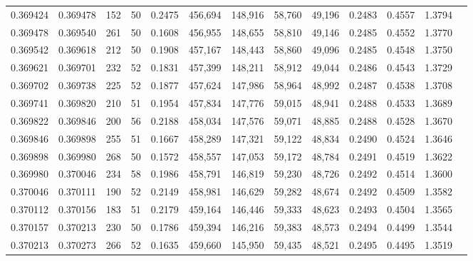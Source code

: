 \begin{tabular}{rrrrrrrrrrrrr}
0.369424 & 0.369478 &   152 &  50 &                                     0.2475 & 456,694 & 148,916 &  58,760 &  49,196 & 0.2483 & 0.4557 & 1.3794 \\
0.369478 & 0.369540 &   261 &  50 &                                     0.1608 & 456,955 & 148,655 &  58,810 &  49,146 & 0.2485 & 0.4552 & 1.3770 \\
0.369542 & 0.369618 &   212 &  50 &                                     0.1908 & 457,167 & 148,443 &  58,860 &  49,096 & 0.2485 & 0.4548 & 1.3750 \\
0.369621 & 0.369701 &   232 &  52 &                                     0.1831 & 457,399 & 148,211 &  58,912 &  49,044 & 0.2486 & 0.4543 & 1.3729 \\
0.369702 & 0.369738 &   225 &  52 &                                     0.1877 & 457,624 & 147,986 &  58,964 &  48,992 & 0.2487 & 0.4538 & 1.3708 \\
0.369741 & 0.369820 &   210 &  51 &                                     0.1954 & 457,834 & 147,776 &  59,015 &  48,941 & 0.2488 & 0.4533 & 1.3689 \\
0.369822 & 0.369846 &   200 &  56 &                                     0.2188 & 458,034 & 147,576 &  59,071 &  48,885 & 0.2488 & 0.4528 & 1.3670 \\
0.369846 & 0.369898 &   255 &  51 &                                     0.1667 & 458,289 & 147,321 &  59,122 &  48,834 & 0.2490 & 0.4524 & 1.3646 \\
0.369898 & 0.369980 &   268 &  50 &                                     0.1572 & 458,557 & 147,053 &  59,172 &  48,784 & 0.2491 & 0.4519 & 1.3622 \\
0.369980 & 0.370046 &   234 &  58 &                                     0.1986 & 458,791 & 146,819 &  59,230 &  48,726 & 0.2492 & 0.4514 & 1.3600 \\
0.370046 & 0.370111 &   190 &  52 &                                     0.2149 & 458,981 & 146,629 &  59,282 &  48,674 & 0.2492 & 0.4509 & 1.3582 \\
0.370112 & 0.370156 &   183 &  51 &                                     0.2179 & 459,164 & 146,446 &  59,333 &  48,623 & 0.2493 & 0.4504 & 1.3565 \\
0.370157 & 0.370213 &   230 &  50 &                                     0.1786 & 459,394 & 146,216 &  59,383 &  48,573 & 0.2494 & 0.4499 & 1.3544 \\
0.370213 & 0.370273 &   266 &  52 &                                     0.1635 & 459,660 & 145,950 &  59,435 &  48,521 & 0.2495 & 0.4495 & 1.3519 \\

\end{tabular}
